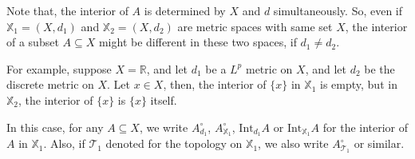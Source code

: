 \begin{note}
	\label{note: interior: notation}
	
	Note that, the interior of $A$ is determined by $X$ and $d$ simultaneously. So, even if $\mathbb X_1 = (X, d_1)$ and $\mathbb X_2 = (X, d_2)$ are metric spaces with same set $X$, the interior of a subset $A \subseteq X$ might be different in these two spaces, if $d_1 \ne d_2$.
	
	For example, suppose $X = \mathbb R$, and let $d_1$ be a $L^p$ metric on $X$, and let $d_2$ be the discrete metric on $X$. Let $x \in X$, then, the interior of $\{x\}$ in $\mathbb X_1$ is empty, but in $\mathbb X_2$, the interior of $\{x\}$ is $\{x\}$ itself.
	
	In this case, for any $A \subseteq X$, we write $A^\circ_{d_1}$, $A^\circ_{\mathbb X_1}$, $\mathrm{Int}_{d_1}A$ or $\mathrm{Int}_{\mathbb X_1}A$ for the interior of $A$ in $\mathbb X_1$. Also, if $\mathcal T_1$ denoted for the topology on $\mathbb X_1$, we also write $A^\circ_{\mathcal T_1}$ or similar.
\end{note}


\begin{lemma}
	
\end{lemma}
























%